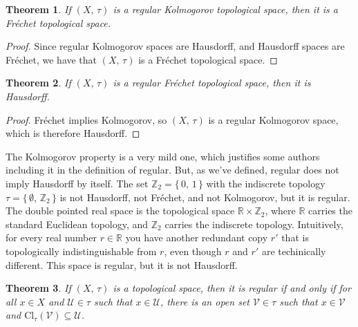 \documentclass{article}
\theoremstyle{plain}
\newtheorem{theorem}{Theorem}[section]
\theoremstyle{normal}
\newenvironment{example}{%
    \pushQED{\qed}\renewcommand{\qedsymbol}{$\blacksquare$}\examplex%
}{%
    \popQED\endexamplex%
}
\begin{document}
        \begin{theorem}
            If $(X,\,\tau)$ is a regular Kolmogorov topological space, then
            it is a Fr\'{e}chet topological space.
        \end{theorem}
        \begin{proof}
            Since regular Kolmogorov spaces are Hausdorff, and Hausdorff spaces
            are Fr\'{e}chet, we have that $(X,\,\tau)$ is a Fr\'{e}chet
            topological space.
        \end{proof}
        \begin{theorem}
            If $(X,\,\tau)$ is a regular Fr\'{e}chet topological space, then
            it is Hausdorff.
        \end{theorem}
        \begin{proof}
            Fr\'{e}chet implies Kolmogorov, so $(X,\,\tau)$ is a regular
            Kolmogorov space, which is therefore Hausdorff.
        \end{proof}
        \begin{example}
            The Kolmogorov property is a very mild one, which justifies
            some authors including it in the definition of regular. But, as
            we've defined, regular does not imply Hausdorff by itself.
            The set $\mathbb{Z}_{2}=\{\,0,\,1\,\}$ with the indiscrete
            topology $\tau=\{\,\emptyset,\,\mathbb{Z}_{2}\,\}$ is not Hausdorff,
            not Fr\'{e}chet, and not Kolmogorov, but it is regular.
        \end{example}
        \begin{example}[\textbf{The Double Pointed Reals}]
            The double pointed real space is the topological space
            $\mathbb{R}\times\mathbb{Z}_{2}$, where $\mathbb{R}$ carries the
            standard Euclidean topology, and $\mathbb{Z}_{2}$ carries the
            indiscrete topology. Intuitively, for every real number
            $r\in\mathbb{R}$ you have another redundant copy $r'$ that is
            topologically indistinguishable from $r$, even though $r$ and $r'$
            are techinically different. This space is regular, but it is
            not Hausdorff. 
        \end{example}
        \begin{theorem}
            If $(X,\,\tau)$ is a topological space, then it is regular if and
            only if for all $x\in{X}$ and $\mathcal{U}\in\tau$ such that
            $x\in\mathcal{U}$, there is an open set $\mathcal{V}\in\tau$
            such that $x\in\mathcal{V}$ and
            $\textrm{Cl}_{\tau}(\mathcal{V})\subseteq\mathcal{U}$.
        \end{theorem}
\end{document}
